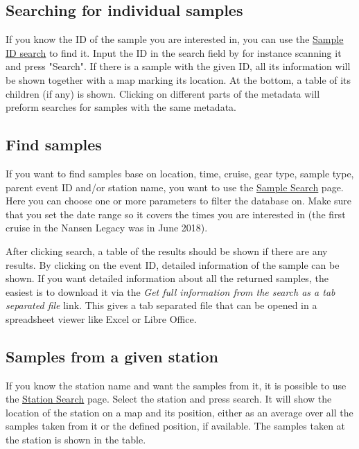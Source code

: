 \documentclass[a4paper,english, 11pt]{article}
\begin{document}
\subsection{Searching for individual samples} %
\label{sub:search_ind}

If you know the ID of the sample you are interested in, you can use the \href{https://www.sios-svalbard.org/reports/ind_sample}{\color{blue}\underline{Sample ID search}} to find it. Input the ID in the search field by for instance scanning it and press "Search". If there is a sample with the given ID, all its information will be shown together with a map marking its location. At the bottom, a table of its children (if any) is shown. Clicking on different parts of the metadata will preform searches for samples with the same metadata. 


\subsection{Find samples} %
\label{sub:find_samples}

If you want to find samples base on location, time, cruise, gear type, sample type, parent event ID and/or station name, you want to use the \href{https://sios-svalbard.org/reports/aen_multi}{\color{blue}\underline{Sample Search}} page. Here you can choose one or more parameters to filter the database on. Make sure that you set the date range so it covers the times you are interested in (the first cruise in the Nansen Legacy was in June 2018).

After clicking search, a table of the results should be shown if there are any results. By clicking on the event ID, detailed information of the sample can be shown. If you want detailed information about all the returned samples, the easiest is to download it via the \emph{Get full information from the search as a tab separated file} link. This gives a tab separated file that can be opened in a spreadsheet viewer like Excel or Libre Office. 

\subsection{Samples from a given station} %
\label{sub:station_search}

If you know the station name and want the samples from it, it is possible to use the \href{https://www.sios-svalbard.org/reports/aen_station}{\color{blue}\underline{Station Search}} page. Select the station and press search. It will show the location of the station on a map and its position, either as an average over all the samples taken from it or the defined position, if available. The samples taken at the station is shown in the table.
\end{document}
